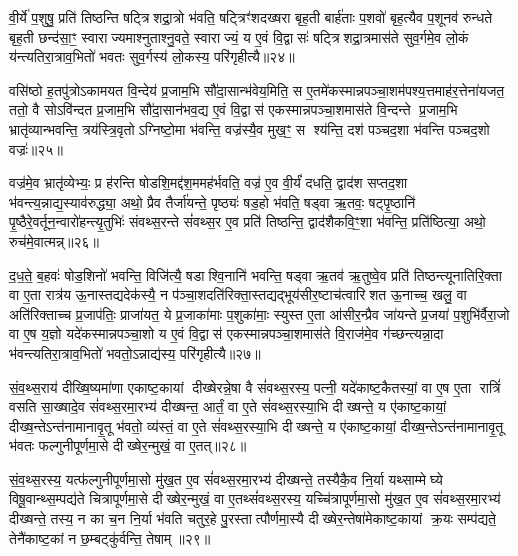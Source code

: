 वी॒र्ये॑ प॒शुषु॒ प्रति॑ तिष्ठन्ति षट्त्रिशद्रा॒त्रो भ॑वति॒ षट्त्रिꣳ॑शदख्षरा बृह॒ती बार्\mbox{}ह॑ताः प॒शवो॑ बृह॒त्यैव प॒शूनव॑ रुन्धते बृह॒ती छन्द॑सा॒ꣳ॒ स्वाराज्यमाश्नुताश्नु॒वते॒ स्वाराज्यं॒ य ए॒वं वि॒द्वासः॑ षट्त्रिशद्रा॒त्रमास॑ते सुव॒र्गमे॒व लो॒कं य॑न्त्यतिरा॒त्राव॒भितो॑ भवतः सुव॒र्गस्य॑ लो॒कस्य॒ परि॑गृहीत्यै॥२४॥

{\anuvakamend[{अ॒ति॒रा॒त्र ओज॑स्ये॒व षट्त्रिꣳ॑शच्च॥६॥}]}

वसि॑ष्ठो ह॒तपु॑त्रोऽकामयत वि॒न्देय॑ प्र॒जाम॒भि सौ॑दा॒सान्भ॑वेय॒मिति॒ स ए॒तमे॑कस्मान्नपञ्चा॒शम॑पश्य॒त्तमाह॑र॒त्तेना॑यजत॒ ततो॒ वै सोऽवि॑न्दत प्र॒जाम॒भि सौ॑दा॒सान॑भव॒द्य ए॒वं वि॒द्वास॑ एकस्मान्नपञ्चा॒शमास॑ते वि॒न्दन्ते प्र॒जाम॒भि भ्रातृ॑व्यान्भवन्ति॒ त्रय॑स्त्रि॒वृतोऽग्निष्टो॒मा भ॑वन्ति॒ वज्र॑स्यै॒व मुख॒ꣳ॒ स श्य॑न्ति॒ दश॑ पञ्चद॒शा भ॑वन्ति पञ्चद॒शो वज्रः॑॥२५॥

वज्र॑मे॒व भ्रातृ॑व्येभ्यः॒ प्र ह॑रन्ति षोडशि॒मद्द॑श॒ममह॑र्भवति॒ वज्र॑ ए॒व वी॒र्यं॑ दधति॒ द्वाद॑श सप्तद॒शा भ॑वन्त्य॒न्नाद्य॒स्याव॑रुद्ध्या॒ अथो॒ प्रैव तैर्जा॑यन्ते॒ पृष्ठ्यः॑ षड॒हो भ॑वति॒ षड्वा ऋ॒तवः॒ षट्पृ॒ष्ठानि॑ पृ॒ष्ठैरे॒वर्तून॒न्वारो॑हन्त्यृ॒तुभिः॑ संवथ्स॒रन्ते सं॑वथ्स॒र ए॒व प्रति॑ तिष्ठन्ति॒ द्वाद॑शैकवि॒ꣳ॒शा भ॑वन्ति॒ प्रति॑ष्ठित्या॒ अथो॒ रुच॑मे॒वात्मन्न्॥२६॥

द॒ध॒ते॒ ब॒हवः॑ षोड॒शिनो॑ भवन्ति॒ विजि॑त्यै॒ षडाश्वि॒नानि॑ भवन्ति॒ षड्वा ऋ॒तव॑ ऋ॒तुष्वे॒व प्रति॑ तिष्ठन्त्यूनातिरि॒क्ता वा ए॒ता रात्र॑य ऊ॒नास्तद्यदेक॑स्यै॒ न प॑ञ्चा॒शदति॑रिक्ता॒स्तद्यद्भूय॑सीर॒ष्टाच॑त्वारिशत ऊ॒नाच्च॒ खलु॒ वा अति॑रिक्ताच्च प्र॒जाप॑तिः॒ प्राजा॑यत॒ ये प्र॒जाका॑माः प॒शुका॑माः॒ स्युस्त ए॒ता आ॑सीर॒न्प्रैव जा॑यन्ते प्र॒जया॑ प॒शुभि॑र्वैरा॒जो वा ए॒ष य॒ज्ञो यदे॑कस्मान्नपञ्चा॒शो य ए॒वं वि॒द्वास॑ एकस्मान्नपञ्चा॒शमास॑ते वि॒राज॑मे॒व ग॑च्छन्त्यन्ना॒दा भ॑वन्त्यतिरा॒त्राव॒भितो॑ भवतो॒ऽन्नाद्य॑स्य॒ परि॑गृहीत्यै॥२७॥

{\anuvakamend[{वज्र॑ आ॒त्मन्प्र॒जया॒ द्वाविꣳ॑शतिश्च॥७॥}]}

सं॒व॒थ्स॒राय॑ दीख्षि॒ष्यमा॑णा एकाष्ट॒कायां दीख्षेरन्ने॒षा वै सं॑वथ्स॒रस्य॒ पत्नी॒ यदे॑काष्ट॒कैतस्यां॒ वा ए॒ष ए॒ता रात्रिं॑ वसति सा॒ख्षादे॒व सं॑वथ्स॒रमा॒रभ्य॑ दीख्षन्त॒ आर्तं॒ वा ए॒ते सं॑वथ्स॒रस्या॒भि दीख्षन्ते॒ य ए॑काष्ट॒कायां॒ दीख्ष॒न्तेऽन्त॑नामानावृ॒तू भ॑वतो॒ व्य॑स्तं॒ वा ए॒ते सं॑वथ्स॒रस्या॒भि दीख्षन्ते॒ य ए॑काष्ट॒कायां॒ दीख्ष॒न्तेऽन्त॑नामानावृ॒तू भ॑वतः फल्गुनीपूर्णमा॒से दीख्षेर॒न्मुखं॒ वा ए॒तत्॥२८॥

सं॒व॒थ्स॒रस्य॒ यत्फ॑ल्गुनीपूर्णमा॒सो मु॑ख॒त ए॒व सं॑वथ्स॒रमा॒रभ्य॑ दीख्षन्ते॒ तस्यैकै॒व नि॒र्या यथ्साम्मेघ्ये विषू॒वान्थ्स॒म्पद्य॑ते चित्रापूर्णमा॒से दीख्षेर॒न्मुखं॒ वा ए॒तथ्सं॑वथ्स॒रस्य॒ यच्चि॑त्रापूर्णमा॒सो मु॑ख॒त ए॒व सं॑वथ्स॒रमा॒रभ्य॑ दीख्षन्ते॒ तस्य॒ न का च॒न नि॒र्या भ॑वति चतुर॒हे पु॒रस्तात्पौर्णमा॒स्यै दीख्षेर॒न्तेषा॑मेकाष्ट॒कायां क्र॒यः सम्प॑द्यते॒ तेनै॑काष्ट॒कां न छ॒म्बट्कु॑र्वन्ति॒ तेषाम्॥२९॥

